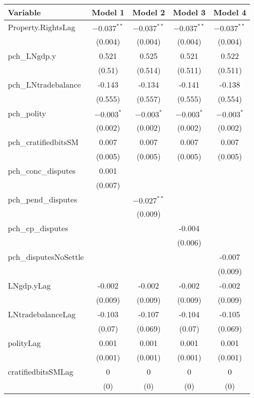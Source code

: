 \begin{table}[ht]
\centering
\begin{tabular}{lcccc}
 Variable & Model 1 & Model 2 & Model 3 & Model 4 \\ 
  \hline
\hline
Property.RightsLag & $-0.037^{\ast\ast}$ & $-0.037^{\ast\ast}$ & $-0.037^{\ast\ast}$ & $-0.037^{\ast\ast}$ \\ 
   & (0.004) & (0.004) & (0.004) & (0.004) \\ 
   \hline
pch\_LNgdp.y & 0.521 & 0.525 & 0.521 & 0.522 \\ 
   & (0.51) & (0.514) & (0.511) & (0.511) \\ 
  pch\_LNtradebalance & -0.143 & -0.134 & -0.141 & -0.138 \\ 
   & (0.555) & (0.557) & (0.555) & (0.554) \\ 
  pch\_polity & $-0.003^{\ast}$ & $-0.003^{\ast}$ & $-0.003^{\ast}$ & $-0.003^{\ast}$ \\ 
   & (0.002) & (0.002) & (0.002) & (0.002) \\ 
  pch\_cratifiedbitsSM & 0.007 & 0.007 & 0.007 & 0.007 \\ 
   & (0.005) & (0.005) & (0.005) & (0.005) \\ 
  pch\_conc\_disputes & 0.001 &  &  &  \\ 
   & (0.007) &  &  &  \\ 
  pch\_pend\_disputes &  & $-0.027^{\ast\ast}$ &  &  \\ 
   &  & (0.009) &  &  \\ 
  pch\_cp\_disputes &  &  & -0.004 &  \\ 
   &  &  & (0.006) &  \\ 
  pch\_disputesNoSettle &  &  &  & -0.007 \\ 
   &  &  &  & (0.009) \\ 
   \hline
LNgdp.yLag & -0.002 & -0.002 & -0.002 & -0.002 \\ 
   & (0.009) & (0.009) & (0.009) & (0.009) \\ 
  LNtradebalanceLag & -0.103 & -0.107 & -0.104 & -0.105 \\ 
   & (0.07) & (0.069) & (0.07) & (0.069) \\ 
  polityLag & 0.001 & 0.001 & 0.001 & 0.001 \\ 
   & (0.001) & (0.001) & (0.001) & (0.001) \\ 
  cratifiedbitsSMLag & 0 & 0 & 0 & 0 \\ 
   & (0) & (0) & (0) & (0) \\ 

\end{tabular}
\end{table}
